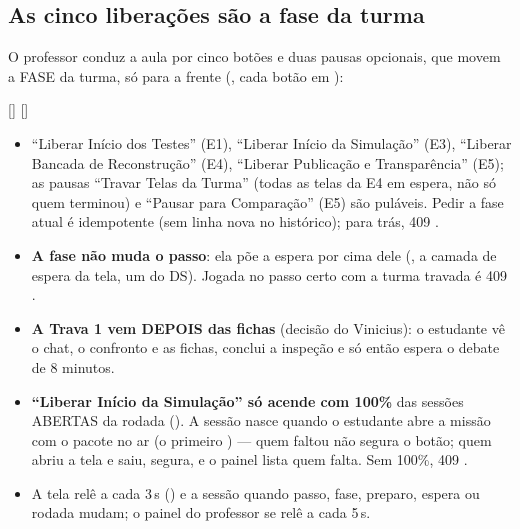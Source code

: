 \subsection{As cinco liberações são a fase da turma}

O professor conduz a aula por cinco botões e duas pausas opcionais, que movem
a FASE da turma, só para a frente (, cada botão
em ):

\begin{center}
 \seta{}  \seta{}  \seta{}
[] \seta{}  \seta{} [] \seta{}
\end{center}

\begin{itemize}
  \item \enquote{Liberar Início dos Testes} (E1), \enquote{Liberar Início da
    Simulação} (E3), \enquote{Liberar Bancada de Reconstrução} (E4),
    \enquote{Liberar Publicação e Transparência} (E5); as pausas
    \enquote{Travar Telas da Turma} (todas as telas da E4 em espera, não só
    quem terminou) e \enquote{Pausar para Comparação} (E5) são puláveis.
    Pedir a fase atual é idempotente (sem linha nova no histórico); para trás,
    409 .
  \item \textbf{A fase não muda o passo}: ela põe a espera por cima dele
    (, a camada de espera da tela, um  do
    DS). Jogada no passo certo com a turma travada é 409
    .
  \item \textbf{A Trava 1 vem DEPOIS das fichas} (decisão do Vinicius): o
    estudante vê o chat, o confronto e as fichas, conclui a inspeção e só
    então espera o debate de 8 minutos.
  \item \textbf{\enquote{Liberar Início da Simulação} só acende com 100\%}
    das sessões ABERTAS da rodada ().
    A sessão nasce quando o estudante abre a missão com o pacote no ar (o
    primeiro ) --- quem faltou não segura o botão; quem abriu a tela e saiu,
    segura, e o painel lista quem falta. Sem 100\%, 409
    .
  \item A tela relê  a cada 3\,s
    () e a sessão quando passo, fase, preparo, espera ou rodada
    mudam; o painel do professor se relê a cada 5\,s.
\end{itemize}

